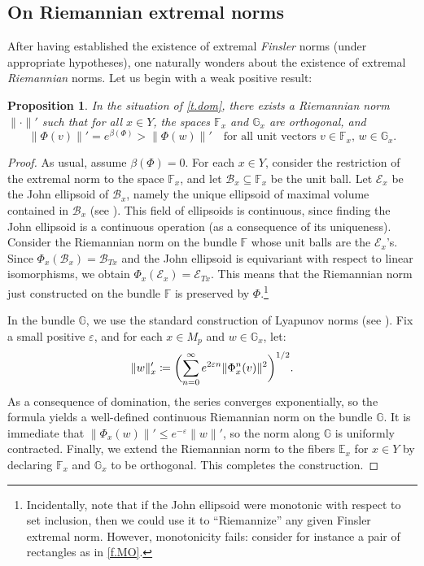 \documentclass[JEP,XML,SOM,Unicode]{cedram}
\let\mathcal\mathscr
\def\vcentcolon{\mathrel{\mathop\ordinarycolon}}
\providecommand\ordinarycolon{:}
\providecommand*\coloneqq{\vcentcolon\mathrel{\mkern-1.2mu}=}
\theoremstyle{plain}
\newtheorem{proposition}[theorem]{Proposition}
\theoremstyle{definition}
\newcommand{\EE}{\mathbb{E}}
\newcommand{\FF}{\mathbb{F}}
\newcommand{\GG}{\mathbb{G}}
\newcommand{\cB}{\mathcal{B}}
\newcommand{\cE}{\mathcal{E}}
\let\epsilon\varepsilon
\begin{document}
\subsection{On Riemannian extremal norms}\label{ss.Riemann}

After having established the existence of extremal \emph{Finsler} norms (under appropriate hypotheses), one naturally wonders about the existence of extremal \emph{Riemannian} norms.
Let us begin with a weak positive result:

\begin{proposition}\label{p.Riem_weak}
In the situation of \cref{t.dom}, there exists a Riemannian norm $\| \mathord{\cdot} \|'$ such that for all $x \in Y$, the spaces $\FF_x$ and $\GG_x$ are orthogonal, and
\[
\| \Phi(v) \|' = e^{\beta(\Phi)} > \|\Phi(w)\|'
\quad \text{for all unit vectors $v \in \FF_x$, $w \in \GG_x$.}
\]
\end{proposition}

\begin{proof}
As usual, assume $\beta(\Phi) = 0$.
For each $x \in Y$, consider the restriction of the extremal norm to the space $\FF_x$, and let $\cB_x \subseteq \FF_x$ be the unit ball.
Let $\cE_x$ be the John ellipsoid of $\cB_x$, namely the unique ellipsoid of maximal volume contained in $\cB_x$ (see \eg \cite{Ball}). This field of ellipsoids is continuous, since finding the John ellipsoid is a continuous operation (as a consequence of its uniqueness).
Consider the Riemannian norm on the bundle $\FF$ whose unit balls are the $\cE_x$'s. Since $\Phi_x (\cB_x) = \cB_{Tx}$ and the John ellipsoid is equivariant with respect to linear isomorphisms, we obtain $\Phi_x (\cE_x) = \cE_{Tx}$. This means that the Riemannian norm just constructed on the bundle $\FF$ is preserved by $\Phi$.\footnote{Incidentally, note that if the John ellipsoid were monotonic with respect to set inclusion, then we could use it to ``Riemannize'' any given Finsler extremal norm. However, monotonicity fails: consider for instance a pair of rectangles as in \cref{f.MO}.}

In the bundle $\GG$, we use the standard construction of Lyapunov norms (see \eg \cite[p.\,667]{KH}).
Fix a small positive $\epsilon$, and for each $x \in M_p$ and $w \in \GG_x$, let:
\[
\| w \|'_x \coloneqq \biggl( \sum_{n=0}^\infty e^{2 \epsilon n} \|\Phi_x^n (v) \|^2 \biggr)^{1/2}.
\]
As a consequence of domination, the series converges exponentially, so the formula yields a well-defined continuous Riemannian norm on the bundle $\GG$.
It is immediate that $\|\Phi_x(w)\|' \le e^{-\epsilon} \|w\|'$, so the norm along $\GG$ is uniformly contracted.
Finally, we extend the Riemannian norm to the fibers $\EE_x$ for $x \in Y$ by declaring $\FF_x$ and $\GG_x$ to be orthogonal.
This completes the construction.
\end{proof}
\end{document}
